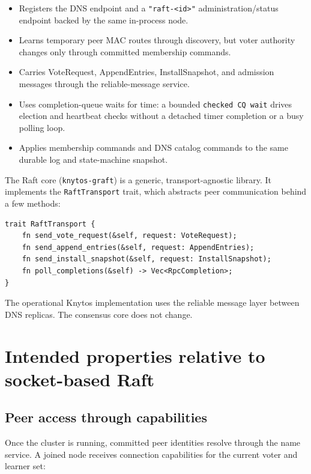 \begin{itemize}
    \item Registers the DNS endpoint and a \texttt{"raft-<id>"}
        administration/status endpoint backed by the same in-process node.
    \item Learns temporary peer MAC routes through discovery, but voter authority
        changes only through committed membership commands.
    \item Carries VoteRequest, AppendEntries, InstallSnapshot, and admission
        messages through the reliable-message service.
    \item Uses completion-queue waits for time: a bounded
        \texttt{checked CQ wait} drives election and heartbeat checks without a
        detached timer completion or a busy polling loop.
    \item Applies membership commands and DNS catalog commands to the same
        durable log and state-machine snapshot.
\end{itemize}

The Raft core (\texttt{knytos-graft}) is a generic, transport-agnostic library.
It implements the \texttt{RaftTransport} trait, which abstracts peer
communication behind a few methods:

\begin{lstlisting}[style=rustCode]
trait RaftTransport {
    fn send_vote_request(&self, request: VoteRequest);
    fn send_append_entries(&self, request: AppendEntries);
    fn send_install_snapshot(&self, request: InstallSnapshot);
    fn poll_completions(&self) -> Vec<RpcCompletion>;
}
\end{lstlisting}

The operational Knytos implementation uses the reliable message layer
between DNS replicas. The consensus core does not change.

\section{Intended properties relative to socket-based Raft}

\subsection{Peer access through capabilities}

Once the cluster is running, committed peer identities resolve through the
name service. A joined node receives connection capabilities for the current
voter and learner set:

